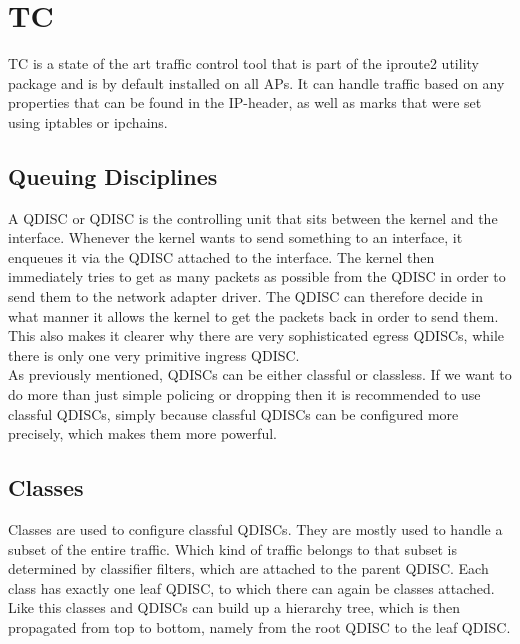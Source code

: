 \section{TC} \label{TC}
\acs{TC} is a state of the art traffic control tool that is part of the iproute2 utility package and is by default installed on all \aclp{AP}. It can handle traffic based on any properties that can be found in the \acs{IP}-header, as well as marks that were set using iptables or ipchains.

\subsection{Queuing Disciplines}

A \acs{QDISC} or \acl{QDISC} is the controlling unit that sits between the kernel and the interface. Whenever the kernel wants to send something to an interface, it enqueues it via the \acs{QDISC} attached to the interface. The kernel then immediately tries to get as many packets as possible from the \acs{QDISC} in order to send them to the network adapter driver. The \acs{QDISC} can therefore decide in what manner it allows the kernel to get the packets back in order to send them. This also makes it clearer why there are very sophisticated egress \acsp{QDISC}, while there is only one very primitive ingress \acs{QDISC}.
\\
As previously mentioned, \acsp{QDISC} can be either classful or classless. If we want to do more than just simple policing or dropping then it is recommended to use classful \acsp{QDISC}, simply because classful \acsp{QDISC} can be configured more precisely, which makes them more powerful.

\subsection{Classes}

Classes are used to configure classful \acsp{QDISC}. They are mostly used to handle a subset of the entire traffic. Which kind of traffic belongs to that subset is determined by classifier filters, which are attached to the parent \acs{QDISC}. Each class has exactly one leaf \acs{QDISC}, to which there can again be classes attached. Like this classes and \acsp{QDISC} can build up a hierarchy tree, which is then propagated from top to bottom, namely from the root \acs{QDISC} to the leaf \acs{QDISC}.

